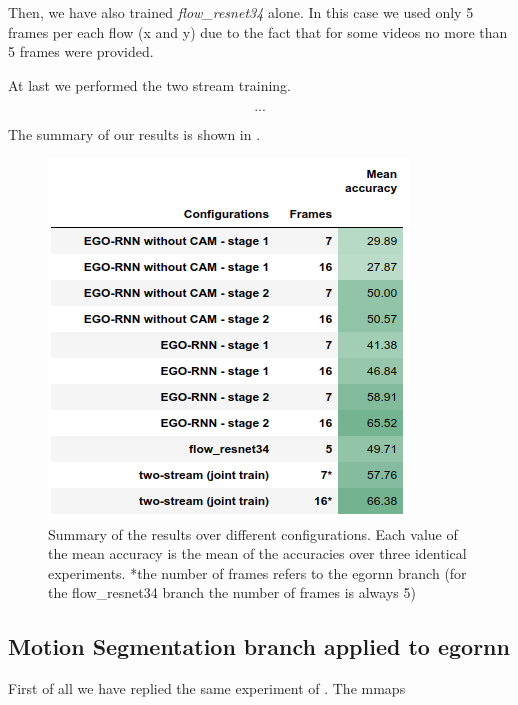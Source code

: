 \documentclass[10pt,twocolumn,hidelinks,letterpaper]{article}
\begin{document}
Then, we have also trained \textit{flow\_resnet34} alone. In this case we used only 5 frames per each flow (x and y) due to the fact that for some videos no more than 5 frames were provided.

At last we performed the two stream training.

\[...\]

The summary of our results is shown in .

\begin{figure}[t]
	\centering
	\includegraphics[width=\linewidth]{images/step1_table.png}
	\caption{Summary of the results over different configurations. Each value of the mean accuracy is the mean of the accuracies over three identical experiments. \small{*the number of frames refers to the egornn branch (for the flow\_resnet34 branch the number of frames is always 5)}}
	\label{step1_table}
\end{figure}

\subsection{Motion Segmentation branch applied to egornn}

First of all we have replied the same experiment of \cite{sparnet}. The mmaps 




{\small


}
\end{document}
